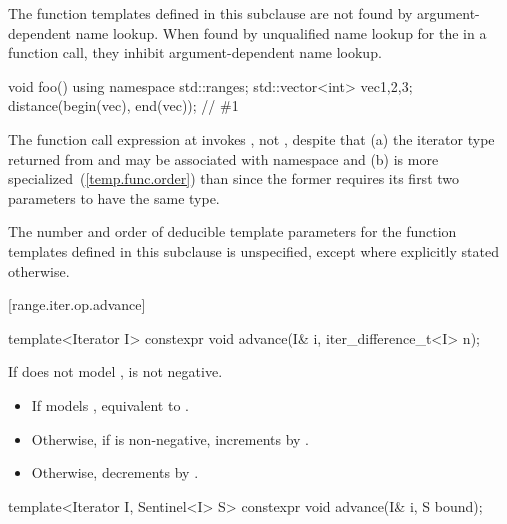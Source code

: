 \pnum
The function templates defined in this subclause are not found by
argument-dependent name lookup. When found by
unqualified name lookup for the
 in a function call, they
inhibit argument-dependent name lookup.

\begin{example}
\begin{codeblock}
void foo() {
    using namespace std::ranges;
    std::vector<int> vec{1,2,3};
    distance(begin(vec), end(vec));     // \#1
}
\end{codeblock}
The function call expression at  invokes ,
not , despite that
(a) the iterator type returned from  and 
may be associated with namespace  and
(b)  is more specialized~(\ref{temp.func.order}) than
 since the former requires its first two parameters
to have the same type.
\end{example}

\pnum
The number and order of deducible template parameters for the function templates defined
in this subclause is unspecified, except where explicitly stated otherwise.

[range.iter.op.advance]{}

%
\begin{itemdecl}
template<Iterator I>
  constexpr void advance(I& i, iter_difference_t<I> n);
\end{itemdecl}

\begin{itemdescr}
\pnum
\expects
If  does not model ,
 is not negative.

\pnum
\effects
\begin{itemize}
\item If  models ,
  equivalent to .
\item Otherwise, if  is non-negative, increments
   by .
\item Otherwise, decrements  by .
\end{itemize}
\end{itemdescr}

%
\begin{itemdecl}
template<Iterator I, Sentinel<I> S>
  constexpr void advance(I& i, S bound);
\end{itemdecl}

